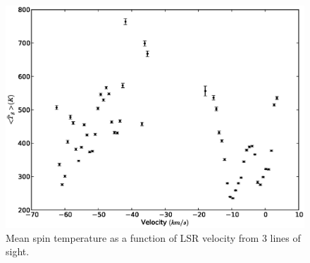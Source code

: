 \documentclass{article}
\begin{document}
\begin{figure}
	\includegraphics[scale=0.6]{meanTs.eps}
\caption{Mean spin temperature as a function of LSR velocity from 3 lines of
sight.}
\end{figure}
\pagebreak
\end{document}
